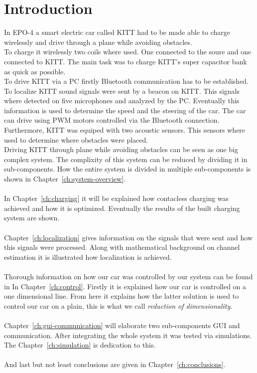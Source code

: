 \documentclass[11pt,titlepage]{report}
\begin{document}
\chapter{Introduction}
In EPO-4 a smart electric car called KITT had to be made able to charge wirelessly and drive through a plane while avoiding obstacles. \\
To charge it wirelessly two coils where used. One connected to the soure and one connected to KITT. The main task was to charge KITT's super capacitor bank as quick as possible. \\
To drive KITT via a PC firstly Bluetooth communication has to be established. To localize KITT sound signals were sent by a beacon on KITT. This signals where detected on five microphones and analyzed by the PC. Eventually this information is used to determine the speed and the steering of the car. The car can drive using PWM motors controlled via the Bluetooth connection. Furthermore, KITT was equiped with two acoustic sensors. This sensors where used to determine where obstacles were placed. \\ 



Driving KITT through plane while avoiding obstacles can be seen as one big complex system. The complixity of this system can be reduced by dividing it in sub-components. How the entire system is divided in multiple sub-components is shown in Chapter~\ref{ch:system-overview}.  \\ \\
 In Chapter~\ref{ch:charging} it will be explained how contacless charging was achieved and how it is optimized. Eventually the results of the built charging system are shown. \\ \\
Chapter~\ref{ch:localization} gives information on the signals that were sent and how this signals were processed. Along with mathematical background on channel estimation it is illustrated how localization is achieved.  \\  \\
Thorough information on how our car was controlled by our system can be found in  In Chapter~\ref{ch:control}. Firstly it is explained how our car is controlled on a one dimensional line. From here it explains how the latter solution is used to control our car on a plain, this is what we call \textit{reduction of dimensionality}. \\  \\
Chapter~\ref{ch:gui-communication} will elaborate two sub-components GUI and communication. After integrating the whole system it was tested via simulations. The Chapter~\ref{ch:simulation} is dedication to this. \\  \\
And last but not least conclusions are given in Chapter~\ref{ch:conclusions}.


  
\end{document}
